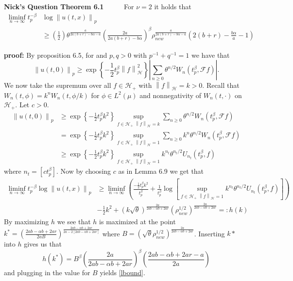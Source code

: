 \documentclass[a4paper,11pt]{article}
\numberwithin{equation}{section}
\theoremstyle{plain}
\theoremstyle{definition}
\newcommand{\Norm}[1]{\left\|  #1   \right\|}
\newcounter{NQ}
\newenvironment{NickQuestion}[1][] %
{\refstepcounter{NQ}
	\begin{mdframed}[backgroundcolor=lightgray]\textbf{Nick's Question \theNQ \: #1~~}~~~\noindent}%
	{\end{mdframed}}
\numberwithin{NQ}{section}
\numberwithin{LQ}{section}
\numberwithin{ZQ}{section}
\begin{document}
	\begin{NickQuestion}[Theorem 6.1]
		For $\nu=2$ it holds that
		\begin{align} \label{lbound}
		\liminf_{n \to \infty} t_p^{-\beta} &\log \Norm{u(t,x)}_p
		\\ &\ge \left(\frac{1}{2}\right) \nonumber \theta^{\frac{a}{2a(b+r)-b\alpha-a}} \left( \frac{2a}{2a(b+r)- b\alpha} \right)^\beta \rho_{new}^{\frac{a}{2a(b+r)-b\alpha-a}}\left(2(b+r)-\frac{b\alpha}{a}-1\right)
		\end{align}

		\textbf{proof:} By proposition 6.5, for and $p,q >0$ with $p^{-1}+q^{-1} = 1$ we have that
		\[
		\Norm{u(t,0)}_p \ge \exp\left\{ -\frac{1}{2} t_p^\beta \Norm{f}_{\mathcal{H}}^2 \right\}\left| \sum_{n \ge 0} \theta^{n/2} W_n(t_p^\beta, \mathcal{F}f) \right|.
		\]
		We now take the supremum over all $f \in \mathcal{H}_+$ with $\Norm{f}_{\mathcal{H}}=k >0 $. Recall that $W_n(t,\phi) = k^nW_n(t,\phi/k)$ for $\phi \in L^2(\mu)$ and nonnegativity of $W_n(t,\cdot)$ on $\mathcal{H}_+$. Let $c>0$.
		\begin{align*}
		\Norm{u(t,0)}_p &\ge 	\exp\left\{ -\frac{1}{2} t_p^\beta k^2 \right\} \sup_{f\in \mathcal{H}_+ \; \Norm{f}_{\mathcal{H}}=k}\sum_{n \ge 0} \theta^{n/2} W_n(t_p^\beta, \mathcal{F}f)
		\\&= \exp\left\{ -\frac{1}{2} t_p^\beta k^2 \right\} \sup_{f\in \mathcal{H}_+ \; \Norm{f}_{\mathcal{H}}=1}\sum_{n \ge 0} k^n \theta^{n/2} W_n(t_p^\beta, \mathcal{F}f)
		\\& \ge \exp\left\{ -\frac{1}{2} t_p^\beta k^2 \right\} \sup_{f\in \mathcal{H}_+ \; \Norm{f}_{\mathcal{H}}=1} k^{n_t} \theta^{{n_t}/2} U_{n_t}(t_p^\beta, f)
		\end{align*}
		where $n_t = [ct_p^\beta]$. Now by choosing $c$ as in Lemma 6.9 we get that
		\begin{align*}
		\liminf_{n \to \infty} t_p^{-\beta} \log \Norm{u(t,x)}_p &\ge 	\liminf_{n \to \infty} \left( \frac{-\frac{1}{2}t_p^\beta k^2}{t_p^\beta} + \frac{1}{t_p^\beta}\log \left[ \sup_{f\in \mathcal{H}_+ \; \Norm{f}_{\mathcal{H}}=1} k^{n_t} \theta^{{n_t}/2} U_{n_t}(t_p^\beta, f) \right]  \right)
		\\& -\frac{1}{2}k^2 + (k\sqrt{\theta})^{ \frac{2a}{2ab-\alpha b +2ar} }(\rho_{new}^{1/2})^{\frac{2a}{2ab -\alpha b + 2ar}} =: h(k)
		\end{align*}
		By maximizing $h$ we see that $h$ is maximized at the point $k^* = \left( \frac{2ab -\alpha b + 2ar}{2aB} \right)^{ \frac{2ab-\alpha b +2ar}{2a-2[2ab-\alpha b + 2ar]} }$ where $B=(\sqrt{\theta}\rho_{new}^{1/2})^{ \frac{2a}{2ab-\alpha b + 2ar} }$. Inserting $k*$ into $h$ gives us that
		\[
		h(k^*) = B^{\beta}\left( \frac{2a}{2ab - \alpha b +2ar} \right)^\beta \left( \frac{2ab-\alpha b + 2ar -a }{2a} \right)
		\]
		and plugging in the value for $B$ yields \ref{lbound}.
	\end{NickQuestion}
\end{document}

